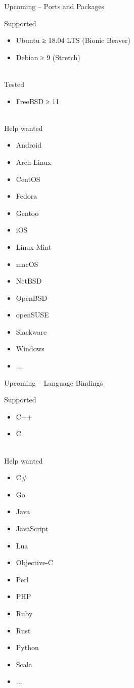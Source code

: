 \documentclass{beamer}
\begin{document}
\begin{frame}{Upcoming – Ports and Packages}
\begin{multicols}{2}
Supported
\begin{itemize}
\item Ubuntu ≥ 18.04 LTS (Bionic Beaver)
\item Debian ≥ 9 (Stretch)
\end{itemize}
\mbox{}\\
Tested
\begin{itemize}
\item FreeBSD ≥ 11
\end{itemize}
\mbox{}\\
Help wanted
\begin{itemize}
\item Android
\item Arch Linux
\item CentOS
\item Fedora
\item Gentoo
\item iOS
\item Linux Mint
\item macOS
\item NetBSD
\item OpenBSD
\item openSUSE
\item Slackware
\item Windows
\item ...
\end{itemize}
\end{multicols}
\end{frame}

\begin{frame}{Upcoming – Language Bindings}
\begin{multicols}{2}
Supported
\begin{itemize}
\item C++
\item C
\end{itemize}
\mbox{}\\
Help wanted
\begin{itemize}
\item C\#
\item Go
\item Java
\item JavaScript
\item Lua
\item Objective-C
\item Perl
\item PHP
\item Ruby
\item Rust
\item Python
\item Scala
\item ...
\end{itemize}
\end{multicols}
\end{frame}
\end{document}

